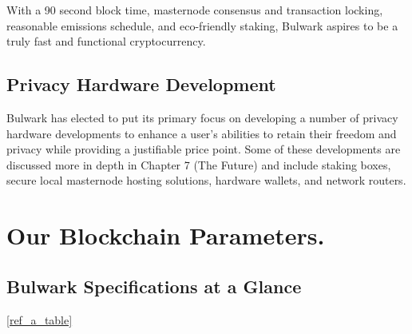 \documentclass[11pt,a4paperpaper,]{report}
\begin{document}
With a 90 second block time, masternode consensus and transaction
locking, reasonable emissions schedule, and eco-friendly staking,
Bulwark aspires to be a truly fast and functional cryptocurrency.

\section{Privacy Hardware
Development}\label{privacy-hardware-development}

Bulwark has elected to put its primary focus on developing a number of
privacy hardware developments to enhance a user's abilities to retain
their freedom and privacy while providing a justifiable price point.
Some of these developments are discussed more in depth in Chapter 7 (The
Future) and include staking boxes, secure local masternode hosting
solutions, hardware wallets, and network routers.

\chapter{Our Blockchain Parameters.}\label{our-blockchain-parameters.}

\section{Bulwark Specifications at a
Glance}\label{bulwark-specifications-at-a-glance}

\ref{ref_a_table}
\end{document}
